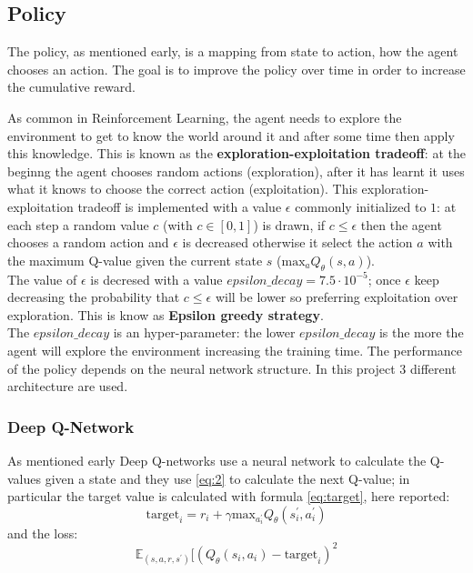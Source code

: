 \documentclass[14pt]{extarticle}
\def\sp{\vspace{5pt}}
\def\pp{\vspace{10pt}\newline}
\begin{document}
\begin{flushleft}
	
	\subsection{Policy}
	\sp
	The policy, as mentioned early, is a mapping from state to action, how the agent chooses an action. The goal is to improve the policy over time in order to increase the cumulative reward. \pp
	
	As common in Reinforcement Learning, the agent needs to explore the environment to get to know the world around it and after some time then apply this knowledge.  This is known as the \textbf{exploration-exploitation tradeoff}: at the beginng the agent chooses random actions (exploration), after it has learnt it uses what it knows to choose the correct action (exploitation). \pp
	This exploration-exploitation tradeoff is implemented with a value $\epsilon$ commonly initialized to $1$: at each step a random value $c$ (with $c \in [0,1]$) is drawn, if $c\leq\epsilon$ then the agent chooses a random action and $\epsilon$ is decreased otherwise it select the action $a$ with the maximum Q-value given the current state $s$ ($\text{max}_{a}Q_{\theta}(s,a)$).
	\\
	The value of $\epsilon$ is decresed with a value $epsilon\_decay = 7.5 \cdot 10^{-5}$; once $\epsilon$ keep decreasing the probability that $c\leq\epsilon$ will be lower so preferring exploitation over exploration. This is know as \textbf{Epsilon greedy strategy}.\\
	The $epsilon\_decay$ is an hyper-parameter: the lower $epsilon\_decay$ is the more the agent will explore the environment increasing the training time. 
	\pp
	The performance of the policy depends on the neural network structure. In this project 3 different architecture are used. %
	
	\subsubsection{Deep Q-Network}
	\sp
	As mentioned early Deep Q-networks use a neural network to calculate the Q-values given a state and they use \ref{eq:2} to calculate the next Q-value; in particular the target value is calculated with formula \ref{eq:target}, here reported:
	\[
\text{target}_i = r_i + \gamma\text{max}_{a_i^\prime}Q_{\theta}(s_i^{\prime},a_i^{\prime})
\]
and the loss:
\[\mathbb{E}_{(s,a,r,s^\prime)}[(Q_{\theta}(s_i,a_i) - \text{target}_i)^2\] 


\end{flushleft}
\end{document}
